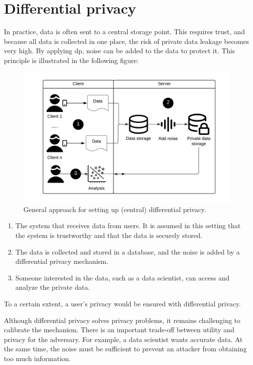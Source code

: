 % 
\section{Differential privacy} \label{section:dp}
In practice, data is often sent to a central storage point.
This requires trust, and because all data is collected in one place, the risk of private data leakage becomes very high.
By applying \gls{dp}, noise can be added to the data to protect it.
This principle is illustrated in the following figure:
\begin{figure}[H]
  \includegraphics[width=1\textwidth]{TheorethicalFramework/Differential privacy/central-dp.png}
  \caption{General approach for setting up (central) differential privacy.}
  \label{fig:central-dp}
\end{figure}

\begin{enumerate}
  \item The system that receives data from users. It is assumed in this setting that the system is trustworthy and that the data is securely stored.
  \item The data is collected and stored in a database, and the noise is added by a differential privacy mechanism.
  \item Someone interested in the data, such as a data scientist, can access and analyze the private data.
\end{enumerate}
To a certain extent, a user's privacy would be ensured with differential privacy. \newline

Although differential privacy solves privacy problems, it remains challenging to calibrate the mechanism.
There is an important trade-off between utility and privacy for the adversary.
For example, a data scientist wants accurate data. At the same time, the noise must be sufficient to prevent an attacker from obtaining too much information.

